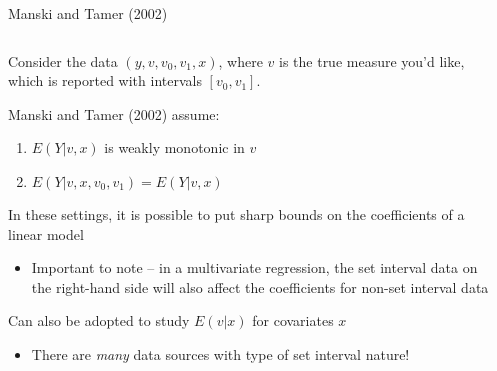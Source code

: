 \documentclass[notes,11pt, aspectratio=169]{beamer}
\newenvironment{wideitemize}{\itemize\addtolength{\itemsep}{10pt}}{\enditemize}
\begin{document}
\begin{frame}{Manski and Tamer (2002)}
      \begin{columns}[onlytextwidth, T] %
        \begin{column}{.9\textwidth}
          \begin{wideitemize}
          \item Consider the data $(y, v, v_{0}, v_{1},x)$, where $v$ is
            the true measure you'd like, which is reported with
            intervals $[v_{0},v_{1}]$. 
          \item Manski and Tamer (2002) assume:
            \begin{enumerate}
            \item $E(Y|v,x) $ is weakly monotonic in $v$
            \item $E(Y|v, x,v_{0},v_{1})= E(Y|v,x)$
            \end{enumerate}
          \item In these settings, it is possible to put sharp bounds
            on the coefficients of a linear model
            \begin{itemize}
            \item Important to note -- in a multivariate regression,
              the set interval data on the right-hand side will also
              affect the coefficients for non-set interval data
            \end{itemize}
          \item Can also be adopted to study $E(v | x)$ for covariates $x$
            \begin{itemize}
            \item There are \emph{many} data sources with type of set interval nature!
            \end{itemize}
          \end{wideitemize}
      \end{column}%
      \hfill%
      \begin{column}{.5\textwidth}
      \end{column}%
    \end{columns}
\end{frame}
\end{document}
